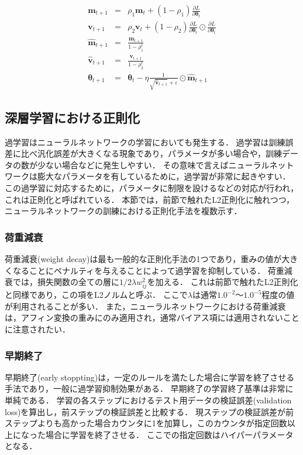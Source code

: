     \begin{eqnarray}
        \boldsymbol{m}_{t+1} &=&\rho_{1} \boldsymbol{m}_{t}+\left(1-\rho_{1}\right) \frac{\partial L}{\partial \boldsymbol{\theta}_{t}} \label{adam_momentum}\\
        \boldsymbol{v}_{t+1} &=&\rho_{2} \boldsymbol{v}_{t}+\left(1-\rho_{2}\right) \frac{\partial L}{\partial \boldsymbol{\theta}_{t}} \odot \frac{\partial L}{\partial \boldsymbol{\theta}_{t}} \\
        \widehat{\boldsymbol{m}}_{t+1} &=&\frac{\boldsymbol{m}_{t+1}}{1-\rho_{1}^{t}} \\
        \widehat{\boldsymbol{v}}_{t+1} &=&\frac{\boldsymbol{v}_{t+1}}{1-\rho_{2}^{t}} \\
        \boldsymbol{\theta}_{t+1} &=&\boldsymbol{\theta}_{t}-\eta \frac{1}{\sqrt{\hat{\boldsymbol{v}}_{t+1}}+\varepsilon} \odot \widehat{\boldsymbol{m}}_{t+1}
    \end{eqnarray}

\subsection{深層学習における正則化}
    過学習はニューラルネットワークの学習においても発生する．
    過学習は訓練誤差に比べ汎化誤差が大きくなる現象であり，パラメータが多い場合や，訓練データの数が少ない場合などに発生しやすい．
    その意味で言えばニューラルネットワークは膨大なパラメータを有しているために，過学習が非常に起きやすい．
    この過学習に対応するために，パラメータに制限を設けるなどの対応が行われ，これは正則化と呼ばれている．
    本節では，前節で触れたL2正則化に触れつつ，ニューラルネットワークの訓練における正則化手法を複数示す．

    \subsubsection{荷重減衰}
    荷重減衰(weight decay)は最も一般的な正則化手法の1つであり，重みの値が大きくなることにペナルティを与えることによって過学習を抑制している．
    荷重減衰では，損失関数の全ての層に$1/2\lambda w_{ij}^2$を加える．
    これは前節で触れたL2正則化と同様であり，この項をL2ノルムと呼ぶ．
    ここで$\lambda$は通常$1.0^{-2}$～$1.0^{-5}$程度の値が利用されることが多い．
    また，ニューラルネットワークにおける荷重減衰は，アフィン変換の重みにのみ適用され，通常バイアス項には適用されないことに注意されたい．

    \subsubsection{早期終了}
    早期終了(early stoppting)は，一定のルールを満たした場合に学習を終了させる手法であり，一般に過学習抑制効果がある\cite{bishop1995regularization,sjoberg1995overtraining}．
    早期終了の学習終了基準は非常に単純である．
    学習の各ステップにおけるテスト用データの検証誤差(validation loss)を算出し，前ステップの検証誤差と比較する．
    現ステップの検証誤差が前ステップよりも高かった場合カウンタに1を加算し，このカウンタが指定回数以上になった場合に学習を終了させる．
    ここでの指定回数はハイパーパラメータとなる．
    
